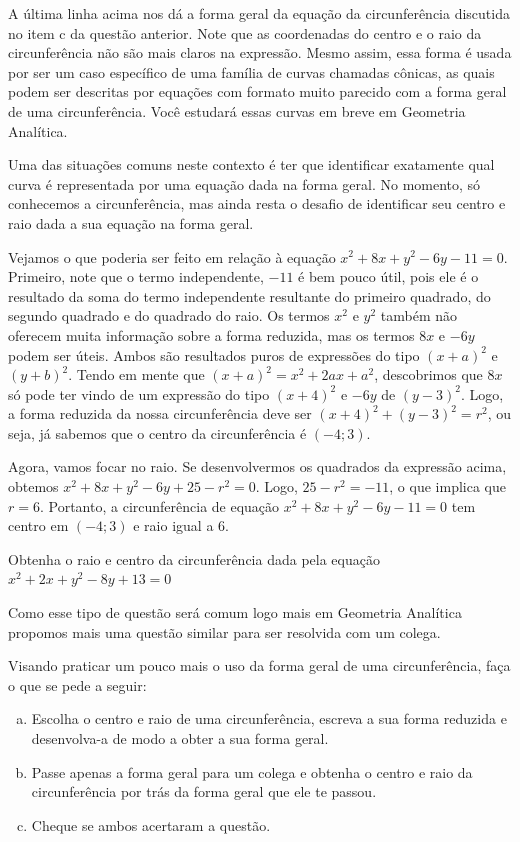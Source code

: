 \documentclass[main_estudante.tex]{subfiles}
\begin{document}
A última linha acima nos dá a forma geral da equação da circunferência discutida no item c da questão anterior. Note que as coordenadas do centro e o raio da circunferência não são mais claros na expressão. Mesmo assim, essa forma é usada por ser um caso específico de uma família de curvas chamadas cônicas, as quais podem ser descritas por equações com formato muito parecido com a forma geral de uma circunferência. Você estudará essas curvas em breve em Geometria Analítica.

Uma das situações comuns neste contexto é ter que identificar exatamente qual curva é representada por uma equação dada na forma geral. No momento, só conhecemos a circunferência, mas ainda resta o desafio de identificar seu centro e raio dada a sua equação na forma geral.

Vejamos o que poderia ser feito em relação à equação $x^2+8x+y^2-6y-11=0$. Primeiro, note que o termo independente, $-11$ é bem pouco útil, pois ele é o resultado da soma do termo independente resultante do primeiro quadrado, do segundo quadrado e do quadrado do raio. Os termos $x^2$ e $y^2$ também não oferecem muita informação sobre a forma reduzida, mas os termos $8x$ e $-6y$ podem ser úteis. Ambos são resultados puros de expressões do tipo $(x+a)^2$ e $(y+b)^2$. Tendo em mente que $(x+a)^2=x^2+2ax+a^2$, descobrimos que $8x$ só pode ter vindo de um expressão do tipo $(x+4)^2$ e $-6y$ de $(y-3)^2$. Logo, a forma reduzida da nossa circunferência deve ser $(x+4)^2+(y-3)^2=r^2$, ou seja, já sabemos que o centro da circunferência é $(-4;3)$.

Agora, vamos focar no raio. Se desenvolvermos os quadrados da expressão acima, obtemos $x^2+8x+y^2-6y+25-r^2=0$. Logo, $25-r^2=-11$, o que implica que $r=6$. Portanto, a circunferência de equação $x^2+8x+y^2-6y-11=0$ tem centro em $(-4;3)$ e raio igual a $6$.

\begin{questao}
Obtenha o raio e centro da circunferência dada pela equação $x^2+2x+y^2-8y+13=0$
\end{questao}

Como esse tipo de questão será comum logo mais em Geometria Analítica propomos mais uma questão similar para ser resolvida com um colega.

\begin{questao}
Visando praticar um pouco mais o uso da forma geral de uma circunferência, faça o que se pede a seguir:
\begin{enumerate}[a)]
\item Escolha o centro e raio de uma circunferência, escreva a sua forma reduzida e desenvolva-a de modo a obter a sua forma geral.
\item Passe apenas a forma geral para um colega e obtenha o centro e raio da circunferência por trás da forma geral que ele te passou.
\item Cheque se ambos acertaram a questão.
\end{enumerate} 
\end{questao}
 
\end{document}
